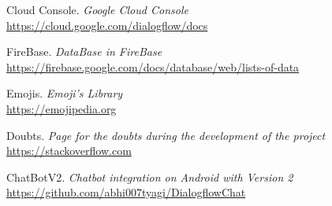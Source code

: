 \documentclass[11pt,a4paper]{article}
\begin{document}
\begin{thebibliography}{5}

Cloud Console. \textit{Google Cloud Console}
\\\url{https://cloud.google.com/dialogflow/docs}

FireBase. \textit{DataBase in FireBase}
\\\url{https://firebase.google.com/docs/database/web/lists-of-data}

Emojis. \textit{Emoji's Library}
\\\url{https://emojipedia.org}

Doubts. \textit{Page for the doubts during the development of the project}
\\\url{https://stackoverflow.com}

ChatBotV2. \textit{Chatbot integration on Android with Version 2}
\\\url{https://github.com/abhi007tyagi/DialogflowChat}

\end{thebibliography}
\end{document}
